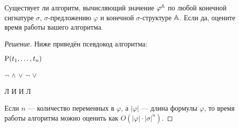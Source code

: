     \begin{problem}[3]
        Существует ли алгоритм, вычисляющий значение \(\varphi^{\mathbb{A}}\) по любой конечной сигнатуре \(\sigma\), \(\sigma\)-предложению \(\varphi\) и конечной \(\sigma\)-структуре \(\mathbb{A}\). Если да, оцените время работы вашего алгоритма.
    \end{problem}
    \begin{proof}[Решение]
        Ниже приведён псевдокод алгоритма:
        \begin{algorithmic}[1]
                    \State \Return \(\operatorname{P}(t_1, \ldots, t_n)\) 
                \EndIf
                \item[]
                
                \If{\(\varphi = \lnot \psi\)}
                    \State \Return \(\lnot\)
                \EndIf
                    \State \Return {} \(\land\) 
                \EndIf
                    \State \Return {} \(\lor\) 
                \EndIf
                    \State \Return \(\lnot\)  \(\lor\) 
                \EndIf
                \item[]

                            \State \Return Л
                        \EndIf
                    \EndFor
                    \State \Return И
                \EndIf
                            \State \Return И
                        \EndIf
                    \EndFor
                    \State \Return Л
                \EndIf
            \EndFunction
        \end{algorithmic}

        Если \(n\) --- количество переменных в \(\varphi\), а \(|\varphi|\) --- длина формулы \(\varphi\), то время работы алгоритма можно оценить как \(O(|\varphi| \cdot |\sigma|^n)\).
    \end{proof}


